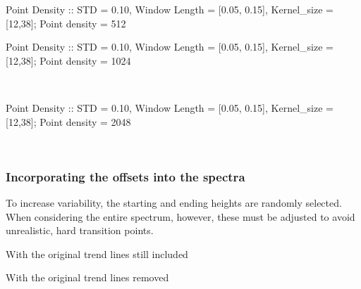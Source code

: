 \documentclass[AMA,LATO1COL]{WileyNJD-v2}
\begin{document}
    
\begin{center}
Point Density :: STD = 0.10, Window Length = [0.05, 0.15], Kernel\_size = [12,38]; Point density = 512


    \begin{center}
    \end{center}
    
    \newpage 
Point Density :: STD = 0.10, Window Length = [0.05, 0.15], Kernel\_size = [12,38]; Point density = 1024


    \begin{center}
    \end{center}
    { \hspace*{\fill} \\}
    
    \newpage 
Point Density :: STD = 0.10, Window Length = [0.05, 0.15], Kernel\_size = [12,38]; Point density = 2048


    \begin{center}
    \end{center}
    { \hspace*{\fill} \\}
\end{center}
    
\subsubsection{Incorporating the offsets into the spectra}\label{reswater:incorporating-the-offsets-into-the-spectra}\raggedright
To increase variability, the starting and ending heights are randomly selected. When considering the entire spectrum, however, these must be adjusted to avoid unrealistic, hard transition points.

\begin{center}
With the original trend lines still included


    \begin{center}
    \end{center}

    
\newpage
With the original trend lines removed


    \begin{center}
    \end{center}

\end{center}
\end{document}
